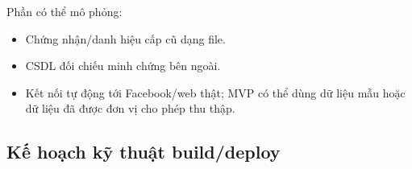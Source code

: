\noindent Phần có thể mô phỏng:

\begin{itemize}
    \item Chứng nhận/danh hiệu cấp cũ dạng file.
    \item CSDL đối chiếu minh chứng bên ngoài.
    \item Kết nối tự động tới Facebook/web thật; MVP có thể dùng dữ liệu mẫu hoặc dữ liệu đã được đơn vị cho phép thu thập.
\end{itemize}

\subsection{Kế hoạch kỹ thuật build/deploy}

\begingroup
\small
\setlength{\tabcolsep}{4pt}
\renewcommand{\arraystretch}{1.25}

